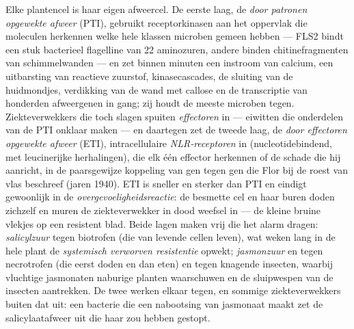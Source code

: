 \begin{definition}\label{def:b3:plant-molecular-physiology:immunity}
Elke plantencel is haar eigen afweercel. De eerste laag, de \emph{door
patronen opgewekte afweer} (PTI), gebruikt receptorkinasen aan het
oppervlak die moleculen herkennen welke hele klassen microben gemeen
hebben --- FLS2 bindt een stuk bacterieel flagelline van 22 aminozuren,
andere binden chitinefragmenten van schimmelwanden --- en zet binnen
minuten een instroom van calcium, een uitbarsting van reactieve
zuurstof, kinasecascades, de sluiting van de huidmondjes, verdikking
van de wand met callose en de transcriptie van honderden afweergenen in
gang; zij houdt de meeste microben tegen. Ziekteverwekkers die toch
slagen spuiten \emph{effectoren} in --- eiwitten die onderdelen van de
PTI onklaar maken --- en daartegen zet de tweede laag, de \emph{door
effectoren opgewekte afweer} (ETI), intracellulaire
\emph{NLR-receptoren} in (nucleotidebindend, met leucinerijke
herhalingen), die elk één effector herkennen of de schade die hij
aanricht, in de paarsgewijze koppeling van gen tegen gen die Flor bij
de roest van vlas beschreef (jaren 1940). ETI is sneller en sterker dan
PTI en eindigt gewoonlijk in de \emph{overgevoeligheidsreactie}: de
besmette cel en haar buren doden zichzelf en muren de ziekteverwekker
in dood weefsel in --- de kleine bruine vlekjes op een resistent blad.
Beide lagen maken  vrij die het alarm dragen:
\emph{salicylzuur} tegen biotrofen (die van levende cellen leven), wat
weken lang in de hele plant de \emph{systemisch verworven resistentie}
opwekt; \emph{jasmonzuur} en  tegen necrotrofen (die eerst
doden en dan eten) en tegen knagende insecten, waarbij vluchtige
jasmonaten naburige planten waarschuwen en de sluipwespen van de
insecten aantrekken. De twee  werken elkaar tegen, en sommige
ziekteverwekkers buiten dat uit: een bacterie die een nabootsing van
jasmonaat maakt zet de salicylaatafweer uit die haar zou hebben
gestopt.
\end{definition}

